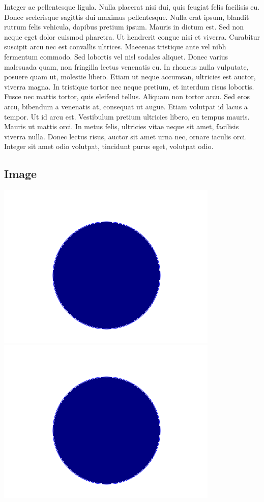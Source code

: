 \documentclass[a4paper]{article}
\begin{document}
\begin{multicols}{5}
		Integer ac pellentesque ligula. Nulla placerat nisi dui, quis feugiat felis facilisis eu. Donec scelerisque sagittis dui maximus pellentesque. Nulla erat ipsum, blandit rutrum felis vehicula, dapibus pretium ipsum. Mauris in dictum est. Sed non neque eget dolor euismod pharetra. Ut hendrerit congue nisi et viverra. Curabitur suscipit arcu nec est convallis ultrices. Maecenas tristique ante vel nibh fermentum commodo.
		Sed lobortis vel nisl sodales aliquet. Donec varius malesuada quam, non fringilla lectus venenatis eu. In rhoncus nulla vulputate, posuere quam ut, molestie libero. Etiam ut neque accumsan, ultricies est auctor, viverra magna. In tristique tortor nec neque pretium, et interdum risus lobortis. Fusce nec mattis tortor, quis eleifend tellus. Aliquam non tortor arcu. Sed eros arcu, bibendum a venenatis at, consequat ut augue. Etiam volutpat id lacus a tempor. Ut id arcu est. Vestibulum pretium ultricies libero, eu tempus mauris. Mauris ut mattis orci. In metus felis, ultricies vitae neque sit amet, facilisis viverra nulla. Donec lectus risus, auctor sit amet urna nec, ornare iaculis orci. Integer sit amet odio volutpat, tincidunt purus eget, volutpat odio.
    \end{multicols}
    \begin{landscape}
    \section{Image}
    	\includegraphics[width=\textwidth]{test.png}
    	\newpage
    	\noindent\includegraphics[width=\linewidth]{test.png}
    \end{landscape}
    
\end{document}

